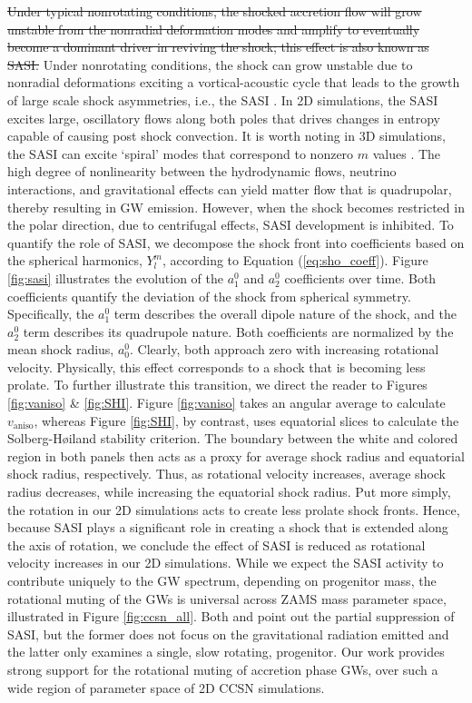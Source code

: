 \documentclass[twocolumn,times]{aastex62}  %
\begin{document}
\st{Under typical nonrotating conditions, the shocked accretion flow will grow unstable from the nonradial deformation modes and amplify to eventually become a dominant driver in reviving the shock; this effect is also known as SASI.} 
Under nonrotating conditions, the shock can grow unstable due to nonradial deformations exciting a vortical-acoustic cycle that leads to the growth of large scale shock asymmetries, i.e., the SASI \citep{blondin:2003, blondin:2006, scheck:2008,marek:2009a}.
In 2D simulations, the SASI excites large, oscillatory flows along both poles that drives changes in entropy capable of causing post shock convection.  It is worth noting in 3D simulations, the SASI can excite `spiral' modes that correspond to nonzero $m$ values \citep{blondin:2007,kuroda:2016}.  The high degree of nonlinearity between the hydrodynamic flows, neutrino interactions, and gravitational effects can yield matter flow that is quadrupolar, thereby resulting in GW emission.  However, when the shock becomes restricted in the polar direction, due to centrifugal effects, SASI development is inhibited.  To quantify the role of SASI, we decompose the shock front into coefficients based on the spherical harmonics, $Y_l^m$, according to Equation (\ref{eq:sho_coeff}). Figure \ref{fig:sasi} illustrates the evolution of the $a_1^0$ and $a_2^0$ coefficients over time.  Both coefficients quantify the deviation of the shock from spherical symmetry.  Specifically, the $a_1^0$ term describes the overall dipole nature of the shock, and the $a_2^0$ term describes its quadrupole nature.  Both coefficients are normalized by the mean shock radius, $a^0_0$.  Clearly, both approach zero with increasing rotational velocity.  Physically, this effect corresponds to a shock that is becoming less prolate.  To further illustrate this transition, we direct the reader to Figures \ref{fig:vaniso} \& \ref{fig:SHI}.  Figure \ref{fig:vaniso} takes an angular average to calculate $v_{\mathrm{aniso}}$, whereas Figure \ref{fig:SHI}, by contrast, uses equatorial slices  to calculate the Solberg-H{\o}iland stability criterion.  The boundary between the white and colored region in both panels then acts as a proxy for average shock radius and equatorial shock radius, respectively.  Thus, as rotational velocity increases, average shock radius decreases, while increasing the equatorial shock radius.  Put more simply, the rotation in our 2D simulations acts to create less prolate shock fronts.  Hence, because SASI plays a significant role in creating a shock that is extended along the axis of rotation, we conclude the effect of SASI is reduced as rotational velocity increases in our 2D simulations.
While we expect the SASI activity to contribute uniquely to the GW spectrum, depending on progenitor mass, the rotational muting of the GWs is universal across ZAMS mass parameter space, illustrated in Figure \ref{fig:ccsn_all}. 
Both \citet{burrows:2007}  and \citet{moro:2018} point out the partial suppression of SASI, but the former does not focus on the gravitational radiation emitted and the latter only examines a single, slow rotating, progenitor.  Our work provides strong support for the rotational muting of accretion phase GWs, over such a wide region of parameter space of 2D CCSN simulations. 
 
\end{document}
